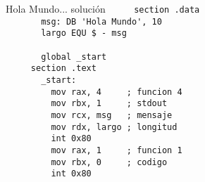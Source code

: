\documentclass[aspectratio=169]{beamer}
\begin{document}
\begin{frame}[fragile]{Hola Mundo... solución}
    \verb|     section .data                  |\\ 
    \verb|       msg: DB 'Hola Mundo', 10     | \A \\
    \verb|       largo EQU $ - msg            |\\
    \verb|                                    |\\
    \verb|       global _start                |\\
    \verb|     section .text                  |\\
    \verb|       _start:                      |\\
    \verb|         mov rax, 4     ; funcion 4 | \A \\
    \verb|         mov rbx, 1     ; stdout    | \A \\
    \verb|         mov rcx, msg   ; mensaje   | \A \\
    \verb|         mov rdx, largo ; longitud  | \A \\
    \verb|         int 0x80                   | \A \\
    \verb|         mov rax, 1     ; funcion 1 | \A \\
    \verb|         mov rbx, 0     ; codigo    | \A \\
    \verb|         int 0x80                   | \A \\
\end{frame}                          
\end{document}
